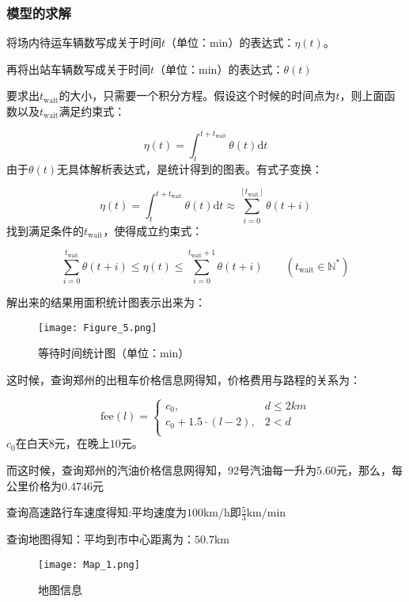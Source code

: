 \documentclass[withoutpreface,bwprint]{cumcmthesis} %
\begin{document}
\subsubsection{模型的求解}
将场内待运车辆数写成关于时间$t$（单位：min）的表达式：$\eta(t)$。\par
再将出站车辆数写成关于时间$t$（单位：min）的表达式：$\theta(t)$\par
要求出$t_{\mathrm{wait}}$的大小，只需要一个积分方程。假设这个时候的时间点为$t$，则上面函数以及$t_{\mathrm{wait}}$满足约束式：\par
\begin{equation}
	\eta(t)=\int_{t}^{t+t_{\mathrm{wait}}}\theta(t)\mathrm dt
\end{equation}
由于$\theta(t)$无具体解析表达式，是统计得到的图表。有式子变换：\par
\begin{equation}
	\eta(t)=\int_{t}^{t+t_{\mathrm{wait}}}\theta(t)\mathrm dt\approx \sum_{i=0}^{[t_{\mathrm{wait}}]}{\theta(t+i)}
\end{equation}
找到满足条件的$t_{\mathrm{wait}}$，使得成立约束式：\par
\begin{equation}
	\sum_{i=0}^{t_{\mathrm{wait}}}{\theta(t+i)}\leq\eta(t) \leq\sum_{i=0}^{t_{\mathrm{wait}}+1}{\theta(t+i)}\quad\quad ( t_{\mathrm{wait}}\in \mathbb{N}^*)
\end{equation}\par
解出来的结果用面积统计图表示出来为：\par
\begin{figure}[!h]
	\centering
	\texttt{[image: Figure\_5.png]}
	\caption{等待时间统计图（单位：min）}
\end{figure}
这时候，查询郑州的出租车价格信息网得知，价格费用与路程的关系为：\par
\begin{equation}
	\mathrm{fee}(l)=\left\{
	\begin{array}{ll}
		c_0,                           & d \leq 2km \\
		c_0+1.5\cdot \left(l-2\right), & 2< d       \\
	\end{array}
	\right.
\end{equation}
$c_0$在白天$8$元，在晚上$10$元。\par
而这时候，查询郑州的汽油价格信息网得知，92号汽油每一升为$5.60$元，那么，每公里价格为$0.4746$元\par
查询高速路行车速度得知:平均速度为$100\mathrm{km/h}$即$\frac{5}{3}\mathrm{km/min} $\par
查询地图得知：平均到市中心距离为：$50.7\mathrm{km}$
\begin{figure}[!h]
	\centering
	\texttt{[image: Map\_1.png]}
	\caption{地图信息}
\end{figure}
\end{document}
